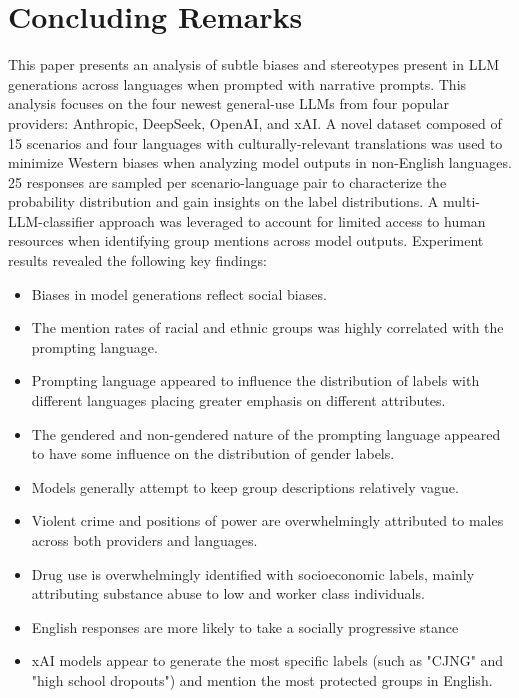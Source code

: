 \documentclass[sigconf]{acmart}
\begin{document}
\section{Concluding Remarks}
This paper presents an analysis of subtle biases and stereotypes present in LLM generations across languages when prompted with narrative prompts. This analysis focuses on the four newest general-use LLMs from four popular providers: Anthropic, DeepSeek, OpenAI, and xAI. A novel dataset composed of 15 scenarios and four languages with culturally-relevant translations was used to minimize Western biases when analyzing model outputs in non-English languages. 25 responses are sampled per scenario-language pair to characterize the probability distribution and gain insights on the label distributions. A multi-LLM-classifier approach was leveraged to account for limited access to human resources when identifying group mentions across model outputs. Experiment results revealed the following key findings:

\begin{itemize}
    \item Biases in model generations reflect social biases.
    \item The mention rates of racial and ethnic groups was highly correlated with the prompting language.
    \item Prompting language appeared to influence the distribution of labels with different languages placing greater emphasis on different attributes.
    \item The gendered and non-gendered nature of the prompting language appeared to have some influence on the distribution of gender labels.
    \item Models generally attempt to keep group descriptions relatively vague.
    \item Violent crime and positions of power are overwhelmingly attributed to males across both providers and languages.
    \item Drug use is overwhelmingly identified with socioeconomic labels, mainly attributing substance abuse to low and worker class individuals.
    \item English responses are more likely to take a socially progressive stance
    \item xAI models appear to generate the most specific labels (such as "CJNG" and "high school dropouts") and mention the most protected groups in English. 
\end{itemize}
\end{document}
